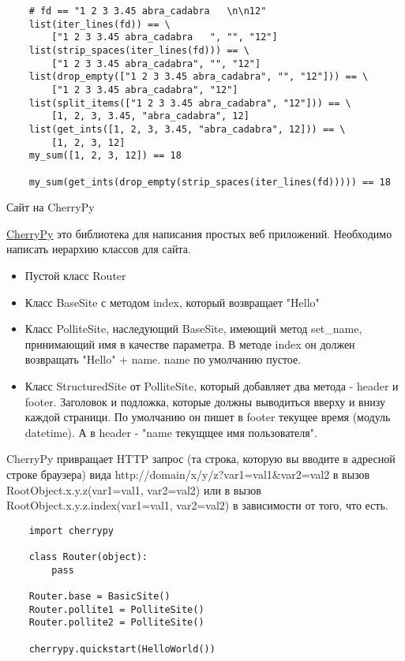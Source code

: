 \documentclass{article}
\begin{document}
\begin{lstlisting}
    # fd == "1 2 3 3.45 abra_cadabra   \n\n12"
    list(iter_lines(fd)) == \
        ["1 2 3 3.45 abra_cadabra   ", "", "12"]
    list(strip_spaces(iter_lines(fd))) == \
        ["1 2 3 3.45 abra_cadabra", "", "12"]
    list(drop_empty(["1 2 3 3.45 abra_cadabra", "", "12"])) == \
        ["1 2 3 3.45 abra_cadabra", "12"]
    list(split_items(["1 2 3 3.45 abra_cadabra", "12"])) == \
        [1, 2, 3, 3.45, "abra_cadabra", 12]
    list(get_ints([1, 2, 3, 3.45, "abra_cadabra", 12])) == \
        [1, 2, 3, 12]
    my_sum([1, 2, 3, 12]) == 18

    my_sum(get_ints(drop_empty(strip_spaces(iter_lines(fd))))) == 18
\end{lstlisting}

\newpage

\begin{center}Сайт на CherryPy\end{center}
\href{http://www.cherrypy.org/}{CherryPy} это библиотека для написания простых веб приложений.
Необходимо написать иерархию классов для сайта.
\begin{itemize}
    \item Пустой класс Router
    \item Класс BaseSite с методом index, который возвращает "Hello"
    \item Класс PolliteSite, наследующий BaseSite, имеющий метод set\_name,
            принимающий имя в качестве параметра.
            В методе index он должен возвращать "Hello" + name. name по умолчанию пустое.
    \item Класс StructuredSite от PolliteSite, который добавляет два метода - header и footer.
          Заголовок и подложка, которые должны выводиться вверху и внизу каждой страници.
          По умолчанию он пишет в footer текущее время (модуль datetime). А в header -
          "name {текущщее имя пользователя}".

\end{itemize}

CherryPy привращает HTTP запрос (та строка, которую вы вводите в адресной строке браузера)
вида http://domain/x/y/z?var1=val1\&var2=val2
в вызов RootObject.x.y.z(var1=val1, var2=val2) или в вызов \\
RootObject.x.y.z.index(var1=val1, var2=val2) в зависимости от того, что есть.

\begin{lstlisting}
    import cherrypy

    class Router(object):
        pass

    Router.base = BasicSite()
    Router.pollite1 = PolliteSite()
    Router.pollite2 = PolliteSite()

    cherrypy.quickstart(HelloWorld())
\end{lstlisting}
\end{document}
